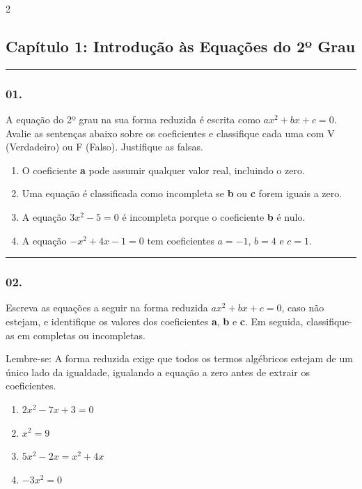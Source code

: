 \documentclass[twoside, 10pt, a4paper]{article}
\newlength{\espacoPosTitulo}\setlength{\espacoPosTitulo}{0.3cm}
\newlength{\espacoPreQuestao}\setlength{\espacoPreQuestao}{0.1cm}
\newlength{\espacoQuestao}\setlength{\espacoQuestao}{0.2cm}
\begin{document}
\par\vspace{0.3cm} 
\raggedcolumns
\begin{multicols*}{2}
\vspace{0.1cm}

\subsection*{Capítulo 1: Introdução às Equações do 2º Grau}
\vspace{-0.2cm}\noindent\rule{\linewidth}{1.5pt} 
\par\vspace{\espacoPosTitulo}
\subsubsection*{01.} A equação do 2º grau na sua forma reduzida é escrita como $ ax^2 + bx + c = 0 $. Avalie as sentenças abaixo sobre os coeficientes e classifique cada uma com V (Verdadeiro) ou F (Falso). Justifique as falsas.
\begin{enumerate}[label=\Roman*.]
    \item O coeficiente \textbf{a} pode assumir qualquer valor real, incluindo o zero.
    \item Uma equação é classificada como incompleta se \textbf{b} ou \textbf{c} forem iguais a zero.
    \item A equação $ 3x^2 - 5 = 0 $ é incompleta porque o coeficiente \textbf{b} é nulo.
    \item A equação $ -x^2 + 4x - 1 = 0 $ tem coeficientes $ a = -1 $, $ b = 4 $ e $ c = 1 $.
\end{enumerate}
\par\vspace{\espacoQuestao}

\noindent\textcolor{CorLinha}{\rule{\linewidth}{0.5pt}} 
\par\vspace{\espacoPreQuestao}
\subsubsection*{02.} Escreva as equações a seguir na forma reduzida $ ax^2 + bx + c = 0 $, caso não estejam, e identifique os valores dos coeficientes \textbf{a}, \textbf{b} e \textbf{c}. Em seguida, classifique-as em completas ou incompletas.
\begin{boxdica}
Lembre-se: A forma reduzida exige que todos os termos algébricos estejam de um único lado da igualdade, igualando a equação a zero antes de extrair os coeficientes.
\end{boxdica}
\begin{enumerate}[label=\Alph*)]
    \item $ 2x^2 - 7x + 3 = 0 $
    \item $ x^2 = 9 $
    \item $ 5x^2 - 2x = x^2 + 4x $
    \item $ -3x^2 = 0 $
\end{enumerate}
\par\vspace{\espacoQuestao}


\end{multicols*}
\end{document}
